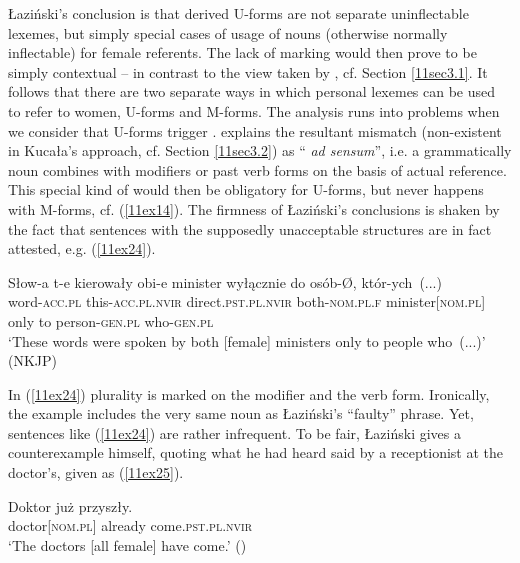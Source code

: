 \documentclass[output=paper,colorlinks,citecolor=brown]{langscibook}
\begin{document}
Łaziński's conclusion is that derived U-forms are not separate uninflectable lexemes, but simply special cases of usage of  nouns (otherwise normally inflectable) for female referents. The lack of marking would then prove to be simply contextual  -- in contrast to the view taken by \citet{kucala1978}, cf. Section \ref{11sec3.1}. It follows that there are two separate ways in which  personal lexemes can be used to refer to women, U-forms and M-forms. The analysis runs into problems when we consider that U-forms trigger  . \citet[231]{lazinski2006} explains the resultant  mismatch (non-existent in Kucała's approach, cf. Section \ref{11sec3.2}) as `` \emph{ad sensum}'', i.e. a grammatically  noun combines with  modifiers or past verb forms on the basis of actual  reference. This special kind of  would then be obligatory for U-forms, but never happens with M-forms, cf. (\ref{11ex14}). The firmness of Łaziński's conclusions is shaken by the fact that sentences with the supposedly unacceptable structures are in fact attested, e.g. (\ref{11ex24}).

\begin{exe}
	\ex \label{11ex24}
	\gll Słow-a t-e kierowały obi-e minister wyłącznie do osób-Ø, \mbox{któr-ych (...)} \\
	word-\textsc{acc.pl} this-\textsc{acc.pl.nvir} direct.\textsc{pst.pl.nvir} both-\textsc{nom.pl.f} minister[\textsc{nom.pl}] only to person-\textsc{gen.pl} who-\textsc{gen.pl} \\
	\trans ‘These words were spoken by both [female] ministers only to people \mbox{who (...)}’ \hfill (NKJP)
\end{exe}

In (\ref{11ex24}) plurality is marked on the modifier and the verb form. Ironically, the example includes the very same noun as Łaziński's ``faulty'' phrase. Yet, sentences like (\ref{11ex24}) are rather infrequent. To be fair, Łaziński gives a counterexample himself, quoting what he had heard said by a receptionist at the doctor's, given as (\ref{11ex25}).

\begin{exe}
	\ex \label{11ex25}
	\gll Doktor już przyszły. \\
	doctor[\textsc{nom.pl}] already come.\textsc{pst.pl.nvir} \\
	\trans ‘The doctors [all female] have come.’ \hfill (\citealt[227]{lazinski2006})
\end{exe}
\end{document}
